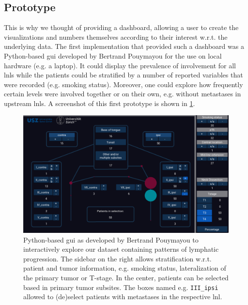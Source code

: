 \documentclass[\relativeRoot/main.tex]{subfiles}
\begin{document}
\subsection*{Prototype}
\label{subsec:lyprox:motivation:prototype}

This is why we thought of providing a dashboard, allowing a user to create the visualizations and numbers themselves according to their interest w.r.t. the underlying data. The first implementation that provided such a dashboard was a Python-based \gls{gui} developed by Bertrand Pouymayou for the use on local hardware (e.g. a laptop). It could display the prevalence of involvement for all \glspl{lnl} while the patients could be stratified by a number of reported variables that were recorded (e.g. smoking status). Moreover, one could explore how frequently certain levels were involved together or on their own, e.g. without metastases in upstream \glspl{lnl}. A screenshot of this first prototype is shown in \cref{fig:lyprox:pouymayou_gui}.

\begin{figure}
    \centering
    \includegraphics[width=1.0\textwidth]{figures/pouymayou_gui.png}
    \caption[
        Prototype of a GUI to explore patterns of lymphatic progression
    ]{
        Python-based \gls{gui} as developed by Bertrand Pouymayou to interactively explore our dataset containing patterns of lymphatic progression. The sidebar on the right allows stratification w.r.t. patient and tumor information, e.g. smoking status, lateralization of the primary tumor or T-stage. In the center, patients can be selected based in primary tumor subsites. The boxes named e.g. \texttt{III\_ipsi} allowed to (de)select patients with metastases in the respective \gls{lnl}.
    }
    \label{fig:lyprox:pouymayou_gui}
\end{figure}
\end{document}
